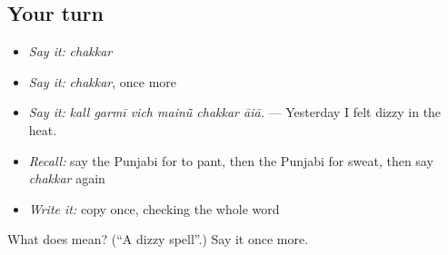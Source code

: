 \subsection*{Your turn}
\begin{itemize}
\raggedright
  \item \emph{Say it:} \emph{chakkar}
  \item \emph{Say it:} \emph{chakkar}, once more
  \item \emph{Say it:} \emph{kall garmī vich mainū̃ chakkar āiā.} — Yesterday I felt dizzy in the heat.
  \item \emph{Recall:} say the Punjabi for to pant, then the Punjabi for sweat, then say \emph{chakkar} again
  \item \emph{Write it:} copy \textbf{} once, checking the whole word
\end{itemize}

\begin{tcolorbox}[breakable,colback=teal!4,colframe=teal!35!black,title={Before you move on}]
What does  mean? (\textquotedblleft{}A dizzy spell\textquotedblright{}.) Say it once more.
\end{tcolorbox}
